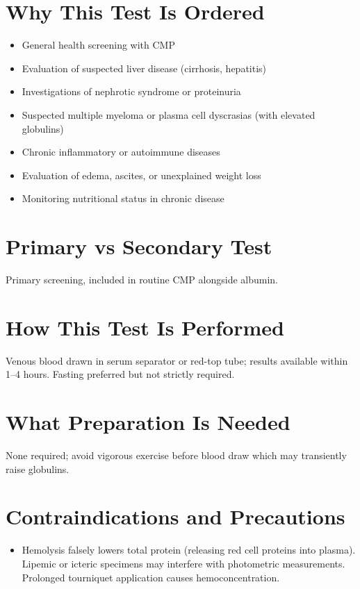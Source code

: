 \section*{Why This Test Is Ordered}
\begin{itemize}
  \item General health screening with CMP
  \item Evaluation of suspected liver disease (cirrhosis, hepatitis)
  \item Investigations of nephrotic syndrome or proteinuria
  \item Suspected multiple myeloma or plasma cell dyscrasias (with elevated globulins)
  \item Chronic inflammatory or autoimmune diseases
  \item Evaluation of edema, ascites, or unexplained weight loss
  \item Monitoring nutritional status in chronic disease
\end{itemize}

\section*{Primary vs Secondary Test}
Primary screening, included in routine CMP alongside albumin.

\section*{How This Test Is Performed}
Venous blood drawn in serum separator or red-top tube; results available within 1--4 hours. Fasting preferred but not strictly required.

\section*{What Preparation Is Needed}
None required; avoid vigorous exercise before blood draw which may transiently raise globulins.

\section*{Contraindications and Precautions}
\begin{itemize}
  \item Hemolysis falsely lowers total protein (releasing red cell proteins into plasma). Lipemic or icteric specimens may interfere with photometric measurements. Prolonged tourniquet application causes hemoconcentration.
\end{itemize}
